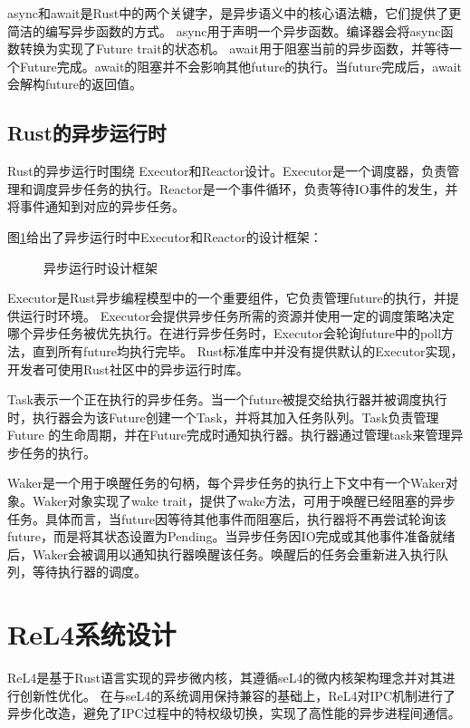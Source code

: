 async和await是Rust中的两个关键字，是异步语义中的核心语法糖，它们提供了更简洁的编写异步函数的方式。
async用于声明一个异步函数。编译器会将async函数转换为实现了Future trait的状态机。
await用于阻塞当前的异步函数，并等待一个Future完成。await的阻塞并不会影响其他future的执行。当future完成后，await会解构future的返回值。


\subsection{Rust的异步运行时}

Rust的异步运行时围绕 Executor和Reactor设计。Executor是一个调度器，负责管理和调度异步任务的执行。Reactor是一个事件循环，负责等待IO事件的发生，并将事件通知到对应的异步任务。

图\ref{asyncruntime}给出了异步运行时中Executor和Reactor的设计框架：

\begin{figure}[htbp]
    \centering
    
    \caption{异步运行时设计框架}\label{asyncruntime}
\end{figure}

Executor是Rust异步编程模型中的一个重要组件，它负责管理future的执行，并提供运行时环境。
Executor会提供异步任务所需的资源并使用一定的调度策略决定哪个异步任务被优先执行。在进行异步任务时，Executor会轮询future中的poll方法，直到所有future均执行完毕。
Rust标准库中并没有提供默认的Executor实现，开发者可使用Rust社区中的异步运行时库。

Task表示一个正在执行的异步任务。当一个future被提交给执行器并被调度执行时，执行器会为该Future创建一个Task，并将其加入任务队列。Task负责管理 Future 的生命周期，并在Future完成时通知执行器。执行器通过管理task来管理异步任务的执行。

Waker是一个用于唤醒任务的句柄，每个异步任务的执行上下文中有一个Waker对象。Waker对象实现了wake trait，提供了wake方法，可用于唤醒已经阻塞的异步任务。具体而言，当future因等待其他事件而阻塞后，执行器将不再尝试轮询该future，而是将其状态设置为Pending。当异步任务因IO完成或其他事件准备就绪后，Waker会被调用以通知执行器唤醒该任务。唤醒后的任务会重新进入执行队列，等待执行器的调度。

\section{ReL4系统设计}

ReL4是基于Rust语言实现的异步微内核，其遵循seL4的微内核架构理念并对其进行创新性优化。
在与seL4的系统调用保持兼容的基础上，ReL4对IPC机制进行了异步化改造，避免了IPC过程中的特权级切换，实现了高性能的异步进程间通信。

